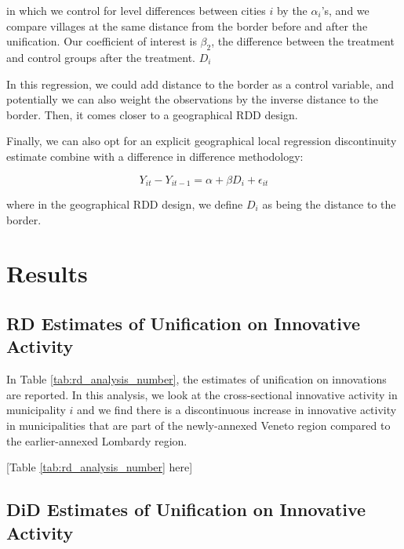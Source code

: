 in which we control for level differences between cities $i$ by the $\alpha_i$'s, and we compare villages at the same distance from the border before and after the unification. Our coefficient of interest is $\beta_2$, the difference between the treatment and control groups after the treatment. $D_i$ 

In this regression, we could add distance to the border as a control variable, and potentially we can also weight the observations by the inverse distance to the border. Then, it comes closer to a geographical RDD design. 

Finally, we can also opt for an explicit geographical local regression discontinuity estimate combine with a difference in difference methodology: 

\begin{equation*}
    Y_{it} - Y_{it-1} = \alpha + \beta D_i + \epsilon_{it}
\end{equation*}

where in the geographical RDD design, we define $D_i$ as being the distance to the border. 




\section{Results}


\subsection{RD Estimates of Unification on Innovative Activity}

In Table \ref{tab:rd_analysis_number}, the estimates of unification on innovations are reported. In this analysis, we look at the cross-sectional innovative activity in municipality $i$ and we find there is a discontinuous increase in innovative activity in municipalities that are part of the newly-annexed Veneto region compared to the earlier-annexed Lombardy region. 

\begin{center}
    [Table \ref{tab:rd_analysis_number} here]
\end{center}

\subsection{DiD Estimates of Unification on Innovative Activity}

